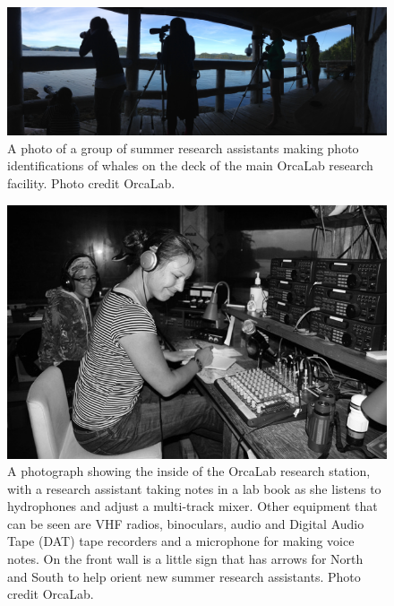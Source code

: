 \documentclass[12pt,oneside]{book}
\begin{document}
\begin{figure}[t]
\centering
\includegraphics[width=\columnwidth]{figures/orcaLabOnDeck}
\caption{A photo of a group of summer research assistants making photo
  identifications of whales on the deck of the main OrcaLab research
  facility.  Photo credit OrcaLab.}
\label{fig:orcaLabOnDeck}
\end{figure}

\begin{figure}[t]
\centering
\includegraphics[width=\columnwidth]{figures/orcaLabWork}
\caption{A photograph showing the inside of the OrcaLab research
  station, with a research assistant taking notes in a lab book
  as she listens to hydrophones and adjust a multi-track mixer.  Other
  equipment that can be seen are VHF radios, binoculars, audio and
  Digital Audio Tape (DAT) tape recorders and a microphone for making
  voice notes.  On the front wall is a little sign that has arrows for
  North and South to help orient new summer research assistants. Photo
  credit OrcaLab.}
\label{fig:orcaLabWork}
\end{figure}
\end{document}
